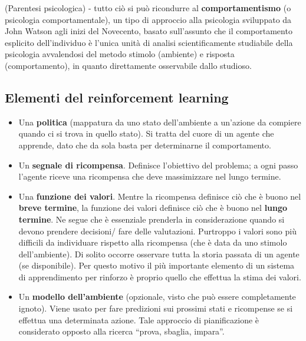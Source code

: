 (Parentesi psicologica) - tutto ciò si può ricondurre al \textbf{comportamentismo}
(o psicologia comportamentale), un tipo di approccio alla psicologia sviluppato da
John Watson agli inizi del Novecento, basato sull'assunto che il comportamento
esplicito dell'individuo è l'unica unità di analisi scientificamente studiabile della
psicologia avvalendosi del metodo stimolo (ambiente) e risposta (comportamento), in
quanto direttamente osservabile dallo studioso.

\subsection{Elementi del reinforcement learning}

\begin{itemize}
 \item Una \textbf{politica} (mappatura da uno stato dell'ambiente a un'azione da compiere
quando ci si trova in quello stato). Si tratta del cuore di un agente che apprende,
dato che da sola basta per determinarne il comportamento.
 \item Un \textbf{segnale di ricompensa}. Definisce l'obiettivo del problema; a ogni passo
l'agente riceve una ricompensa che deve massimizzare nel lungo termine.
 \item Una \textbf{funzione dei valori}. Mentre la ricompensa definisce ciò che è buono
nel \textbf{breve termine}, la funzione dei valori definisce ciò che è buono nel
\textbf{lungo termine}.
Ne segue che è essenziale prenderla in considerazione quando si devono prendere decisioni/
fare delle valutazioni. Purtroppo i valori sono più difficili da individuare rispetto alla
ricompensa (che è data da uno stimolo dell'ambiente). Di solito occorre osservare tutta
la storia passata di un agente (se disponibile).
Per questo motivo il più importante elemento di un sistema di apprendimento per rinforzo
è proprio quello che effettua la stima dei valori.
 \item Un \textbf{modello dell'ambiente} (opzionale, visto che può essere completamente
ignoto). Viene usato per fare predizioni sui prossimi stati e ricompense se si effettua una
determinata azione. Tale approccio di pianificazione è considerato opposto alla ricerca
``prova, sbaglia, impara''.
\end{itemize}
